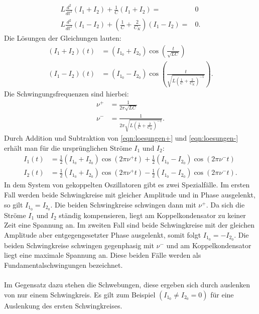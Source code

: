 \begin{align}
 L\frac{d^2}{dt^2}(I_1+I_2) + \frac{1}{C}(I_1+I_2)=&0\\
 L\frac{d^2}{dt^2}(I_1-I_2) + \left(\frac{1}{C} + \frac{2}{C_K} \right)(I_1-I_2)=&0.
\end{align}
 Die Lösungen der Gleichungen lauten:\\
 \begin{align}
   (I_1+I_2)(t)&=(I_{1_0}+I_{2_0})\cos\left(\frac{t}{\sqrt{LC}}\right) \label{eqn:loesungen+}\\
   (I_1-I_2)(t)&=(I_{1_0}-I_{2_0})\cos\left(\frac{t}{\sqrt{L\left(\frac{1}{C}+\frac{2}{C_K}\right)^{-1}}}\right) \label{eqn:loesungen-}.
 \end{align}
 Die Schwingungsfrequenzen sind hierbei:
 \begin{align}
   \nu^{+}&=\frac{1}{2\pi\sqrt{LC}} \label{eqn:Frequenz1}\\
   \nu^{-}&=\frac{1}{2\pi\sqrt{L\left(\frac{1}{C}+\frac{2}{C_K}\right)^{-1}}}\label{eqn:Frequenz2}.
 \end{align}
Durch Addition und Subtraktion von \eqref{eqn:loesungen+} und \eqref{eqn:loesungen-}  erhält man für die ursprünglichen Ströme $I_1$ und $I_2$:\\
 \begin{align}
   I_1(t)&=\frac{1}{2}(I_{1_0}+I_{2_0})\cos(2\pi\nu^{+}t)+\frac{1}{2}(I_{1_0}-I_{2_0})\cos(2\pi\nu^{-}t)\label{eqn:strom1}\\
   I_2(t)&=\frac{1}{2}(I_{1_0}+I_{2_0})\cos(2\pi\nu^{+}t)-\frac{1}{2}(I_{1_0}-I_{2_0})\cos(2\pi\nu^{-}t)\label{eqn:strom2}.
 \end{align}
 In dem System von gekoppelten Oszillatoren gibt es zwei Spezialfälle.
 Im ersten Fall werden beide Schwingkreise mit gleicher Amplitude und in Phase ausgelenkt, so gilt $I_{1_0}=I_{2_0}$.
 Die beiden Schwingkreise schwingen dann mit $\nu^{+} $.
 Da sich die Ströme $I_1$ und $I_2$ ständig kompensieren, liegt am Koppelkondensator zu keiner Zeit eine Spannung an.
 Im zweiten Fall sind beide Schwingkreise mit der gleichen Amplitude aber entgegengesetzter Phase ausgelenkt, somit folgt $I_{1_0}=-I_{2_0}$.
 Die beiden Schwingkreise schwingen gegenphasig mit $\nu^{-}$ und am Koppelkondensator liegt eine maximale Spannung an.
 Diese beiden Fälle werden als Fundamentalschwingungen bezeichnet.\\
 \\
 Im Gegensatz dazu stehen die Schwebungen, diese ergeben sich durch auslenken von nur einem Schwingkreis.
 Es gilt zum Beispiel $(I_{1_0}\neq I_{2_0}=0)$ für eine Auslenkung des ersten Schwingkreises.
